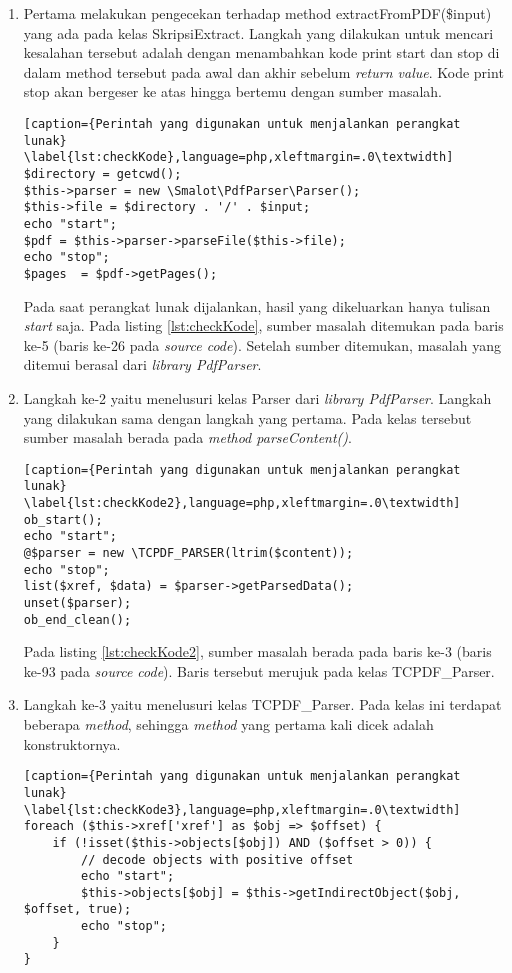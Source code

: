 \begin{enumerate}
	\item Pertama melakukan pengecekan terhadap method extractFromPDF(\$input) yang ada pada kelas SkripsiExtract. Langkah yang dilakukan untuk mencari kesalahan tersebut adalah dengan menambahkan kode print start dan stop di dalam method tersebut pada awal dan akhir sebelum \textit{return value}. Kode print stop akan bergeser ke atas hingga bertemu dengan sumber masalah. 
	
\begin{lstlisting}[caption={Perintah yang digunakan untuk menjalankan perangkat lunak}	\label{lst:checkKode},language=php,xleftmargin=.0\textwidth]
$directory = getcwd();
$this->parser = new \Smalot\PdfParser\Parser();
$this->file = $directory . '/' . $input;
echo "start";
$pdf = $this->parser->parseFile($this->file);
echo "stop";
$pages  = $pdf->getPages();
\end{lstlisting}

Pada saat perangkat lunak dijalankan, hasil yang dikeluarkan hanya tulisan \textit{start} saja. Pada listing \ref{lst:checkKode}, sumber masalah ditemukan pada baris ke-5 (baris ke-26 pada \textit{source code}). Setelah sumber ditemukan, masalah yang ditemui berasal dari \textit{library PdfParser}.
	
	\item Langkah ke-2 yaitu menelusuri kelas Parser dari \textit{library PdfParser}. Langkah yang dilakukan sama dengan langkah yang pertama. Pada kelas tersebut sumber masalah berada pada \textit{method parseContent()}.
	
\begin{lstlisting}[caption={Perintah yang digunakan untuk menjalankan perangkat lunak}	\label{lst:checkKode2},language=php,xleftmargin=.0\textwidth]
ob_start();
echo "start";
@$parser = new \TCPDF_PARSER(ltrim($content));
echo "stop";
list($xref, $data) = $parser->getParsedData();
unset($parser);
ob_end_clean();
\end{lstlisting}
	
	Pada listing \ref{lst:checkKode2}, sumber masalah berada pada baris ke-3 (baris ke-93 pada \textit{source code}). Baris tersebut merujuk pada kelas TCPDF\_Parser.	
	
	\item Langkah ke-3 yaitu menelusuri kelas TCPDF\_Parser. Pada kelas ini terdapat beberapa \textit{method}, sehingga \textit{method} yang pertama kali dicek adalah konstruktornya.
	
\begin{lstlisting}[caption={Perintah yang digunakan untuk menjalankan perangkat lunak}	\label{lst:checkKode3},language=php,xleftmargin=.0\textwidth]
foreach ($this->xref['xref'] as $obj => $offset) {
	if (!isset($this->objects[$obj]) AND ($offset > 0)) {
		// decode objects with positive offset
		echo "start";
		$this->objects[$obj] = $this->getIndirectObject($obj, $offset, true);
		echo "stop";
	}
}
\end{lstlisting}


\end{enumerate}
